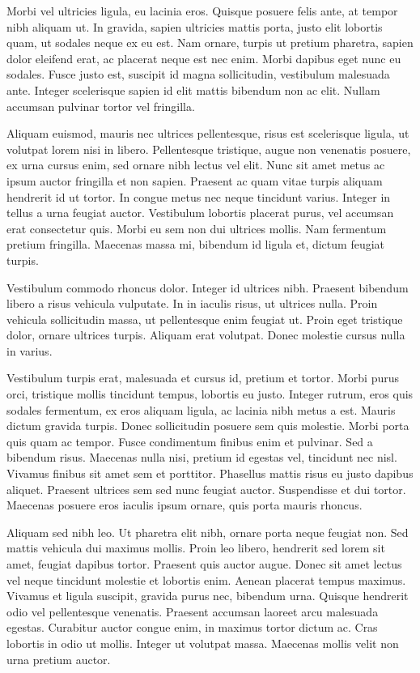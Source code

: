 Morbi vel ultricies ligula, eu lacinia eros. Quisque posuere felis ante, at tempor nibh aliquam ut. In gravida, sapien ultricies mattis porta, justo elit lobortis quam, ut sodales neque ex eu est. Nam ornare, turpis ut pretium pharetra, sapien dolor eleifend erat, ac placerat neque est nec enim. Morbi dapibus eget nunc eu sodales. Fusce justo est, suscipit id magna sollicitudin, vestibulum malesuada ante. Integer scelerisque sapien id elit mattis bibendum non ac elit. Nullam accumsan pulvinar tortor vel fringilla.

Aliquam euismod, mauris nec ultrices pellentesque, risus est scelerisque ligula, ut volutpat lorem nisi in libero. Pellentesque tristique, augue non venenatis posuere, ex urna cursus enim, sed ornare nibh lectus vel elit. Nunc sit amet metus ac ipsum auctor fringilla et non sapien. Praesent ac quam vitae turpis aliquam hendrerit id ut tortor. In congue metus nec neque tincidunt varius. Integer in tellus a urna feugiat auctor. Vestibulum lobortis placerat purus, vel accumsan erat consectetur quis. Morbi eu sem non dui ultrices mollis. Nam fermentum pretium fringilla. Maecenas massa mi, bibendum id ligula et, dictum feugiat turpis.

Vestibulum commodo rhoncus dolor. Integer id ultrices nibh. Praesent bibendum libero a risus vehicula vulputate. In in iaculis risus, ut ultrices nulla. Proin vehicula sollicitudin massa, ut pellentesque enim feugiat ut. Proin eget tristique dolor, ornare ultrices turpis. Aliquam erat volutpat. Donec molestie cursus nulla in varius.

Vestibulum turpis erat, malesuada et cursus id, pretium et tortor. Morbi purus orci, tristique mollis tincidunt tempus, lobortis eu justo. Integer rutrum, eros quis sodales fermentum, ex eros aliquam ligula, ac lacinia nibh metus a est. Mauris dictum gravida turpis. Donec sollicitudin posuere sem quis molestie. Morbi porta quis quam ac tempor. Fusce condimentum finibus enim et pulvinar. Sed a bibendum risus. Maecenas nulla nisi, pretium id egestas vel, tincidunt nec nisl. Vivamus finibus sit amet sem et porttitor. Phasellus mattis risus eu justo dapibus aliquet. Praesent ultrices sem sed nunc feugiat auctor. Suspendisse et dui tortor. Maecenas posuere eros iaculis ipsum ornare, quis porta mauris rhoncus.

Aliquam sed nibh leo. Ut pharetra elit nibh, ornare porta neque feugiat non. Sed mattis vehicula dui maximus mollis. Proin leo libero, hendrerit sed lorem sit amet, feugiat dapibus tortor. Praesent quis auctor augue. Donec sit amet lectus vel neque tincidunt molestie et lobortis enim. Aenean placerat tempus maximus. Vivamus et ligula suscipit, gravida purus nec, bibendum urna. Quisque hendrerit odio vel pellentesque venenatis. Praesent accumsan laoreet arcu malesuada egestas. Curabitur auctor congue enim, in maximus tortor dictum ac. Cras lobortis in odio ut mollis. Integer ut volutpat massa. Maecenas mollis velit non urna pretium auctor. 
